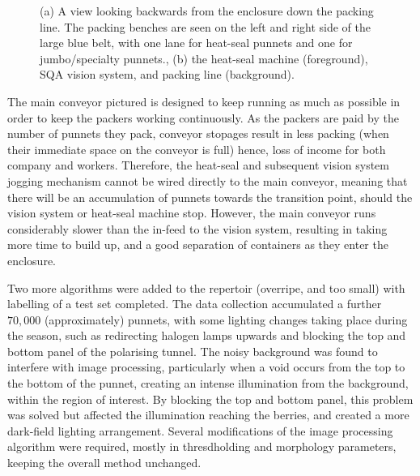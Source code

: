 \documentclass[fleqn,twoside,12pt]{report}
\begin{document}
\begin{figure}[ht]
\begin{subfigure}{.35\textwidth}
		\caption{}
		\label{fig:myponga_system_line}
	\end{subfigure}%
	
	\caption{(a) A view looking backwards from the enclosure down the packing line. The packing benches are seen on the left and right side of the large blue belt, with one lane for heat-seal punnets and one for jumbo/specialty punnets., (b) the heat-seal machine (foreground), SQA vision system, and packing line (background).}
	\label{}
\end{figure}

The main conveyor pictured is designed to keep running as much as possible in order to keep the packers working continuously. As the packers are paid by the number of punnets they pack, conveyor stopages result in less packing (when their immediate space on the conveyor is full) hence, loss of income for both company and workers. Therefore, the heat-seal and subsequent vision system jogging mechanism cannot be wired directly to the main conveyor, meaning that there will be an accumulation of punnets towards the transition point, should the vision system or heat-seal machine stop. However, the main conveyor runs considerably slower than the in-feed to the vision system, resulting in taking more time to build up, and a good separation of containers as they enter the enclosure.

Two more algorithms were added to the repertoir (overripe, and too small) with labelling of a test set completed. The data collection accumulated a further $70,000$ (approximately) punnets, with some lighting changes taking place during the season, such as redirecting halogen lamps upwards and blocking the top and bottom panel of the polarising tunnel. The noisy background was found to interfere with image processing, particularly when a void occurs from the top to the bottom of the punnet, creating an intense illumination from the background, within the region of interest. By blocking the top and bottom panel, this problem was solved but affected the illumination reaching the berries, and created a more dark-field lighting arrangement. Several modifications of the image processing algorithm were required, mostly in thresdholding and morphology parameters, keeping the overall method unchanged. 
\end{document}
